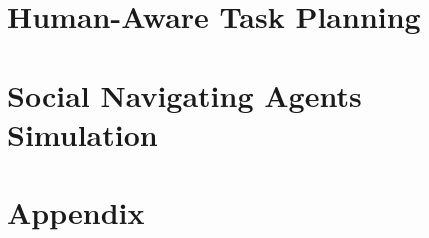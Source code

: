 \documentclass[english,a4paper,12pt,twoside]{StyleThese}
\begin{document}




\dominitoc
{}




\tableofcontents

\printnoidxglossary[type=\acronymtype]
%

\mainmatter



\part{Human-Aware Task Planning} \label{part:1}






\part{Social Navigating Agents Simulation} \label{part:2}





\part{Appendix}
\appendix

\end{document}
